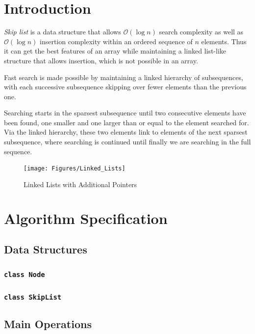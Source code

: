 \documentclass[10pt,english, openany]{book}
\begin{document}
\tableofcontents{}

\mainmatter

\chapter{Introduction}
\textit{Skip list} is a data structure that allows $\mathcal O(\log n)$ search complexity as well as $\mathcal O(\log n)$ insertion complexity within an ordered sequence of $n$ elements. Thus it can get the best features of an array while maintaining a linked list-like structure that allows insertion, which is not possible in an array. 

Fast search is made possible by maintaining a linked hierarchy of subsequences, with each successive subsequence skipping over fewer elements than the previous one. 

Searching starts in the sparsest subsequence until two consecutive elements have been found, one smaller and one larger than or equal to the element searched for. Via the linked hierarchy, these two elements link to elements of the next sparsest subsequence, where searching is continued until finally we are searching in the full sequence.
\vspace{2cm}
\begin{figure}[h]
	\centering
	\texttt{[image: Figures/Linked\_Lists]}
	\caption{Linked Lists with Additional Pointers}
\end{figure}
\chapter{Algorithm Specification}
\section{Data Structures}
\subsection{\texttt{class Node}}
\subsection{\texttt{class SkipList}}
\section{Main Operations}
\end{document}

